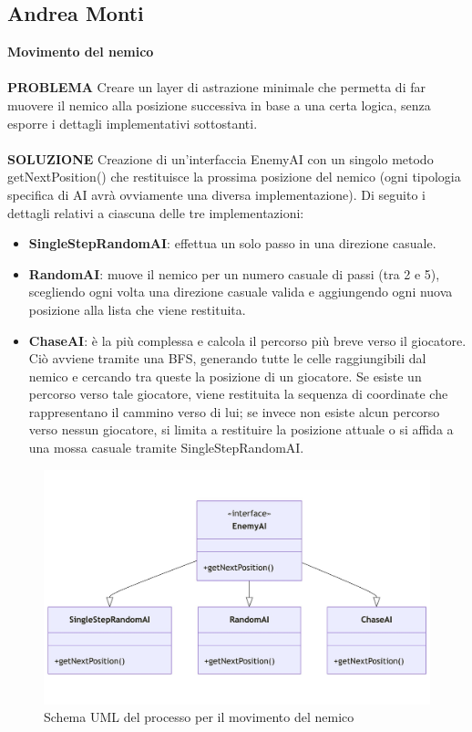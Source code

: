 \documentclass[a4paper,12pt]{report}
\begin{document}
\subsection{Andrea Monti}
\textbf{Movimento del nemico}
\\
\\
\textbf{PROBLEMA}
Creare un layer di astrazione minimale che permetta di far muovere il nemico alla posizione successiva in base a una certa logica, 
senza esporre i dettagli implementativi sottostanti.
\\
\\
\textbf{SOLUZIONE}
Creazione di un’interfaccia EnemyAI con un singolo metodo getNextPosition() che restituisce la 
prossima posizione del nemico (ogni tipologia specifica di AI avrà ovviamente una diversa implementazione). 
Di seguito i dettagli relativi a ciascuna delle tre implementazioni:
\begin{itemize}
	\item \textbf{SingleStepRandomAI}: effettua un solo passo in una direzione casuale. 
	\item \textbf{RandomAI}: muove il nemico per un numero casuale di passi (tra 2 e 5), scegliendo ogni volta una 
	direzione casuale valida e aggiungendo ogni nuova posizione alla lista che viene restituita.
	\item \textbf{ChaseAI}: è la più complessa e calcola il percorso più breve verso il giocatore.
	Ciò avviene tramite una BFS, generando tutte le celle raggiungibili dal nemico e cercando tra queste la posizione 
	di un giocatore. Se esiste un percorso verso tale giocatore, viene restituita la sequenza di coordinate che rappresentano 
	il cammino verso di lui; se invece non esiste alcun percorso verso nessun giocatore, si limita a restituire la posizione 
	attuale o si affida a una mossa casuale tramite SingleStepRandomAI.
\end{itemize}
\begin{figure}[H]
	\centering{}
	\includegraphics[width=14cm]{img/MovimentoNemico.png}
	\caption{Schema UML del processo per il movimento del nemico}
	\label{img:Traduzione Informazioni}
\end{figure}
\end{document}
